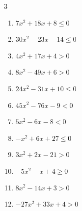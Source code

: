 \begin{multicols}{3}
\begin{enumerate}

  \item $7x^{2}+18x+8\leq 0$


  \item $30x^{2}-23x-14\leq 0$


  \item $4x^{2}+17x+4>0$


\columnbreak %

  \item $8x^{2}-49x+6>0$


  \item $24x^{2}-31x+10\leq 0$


  \item $45x^{2}-76x-9<0$


  \item $5x^{2}-6x-8<0$


  \item $-x^{2}+6x+27\leq 0$

        \phantom{$\displaystyle x \leqq -3 , \; 9 \leqq x$}

  \item $3x^{2}+2x-21>0$


  \item $-5x^{2}-x+4\geq 0$


  \item $8x^{2}-14x+3>0$


  \item $-27x^{2}+33x+4>0$


\end{enumerate}
\end{multicols}
